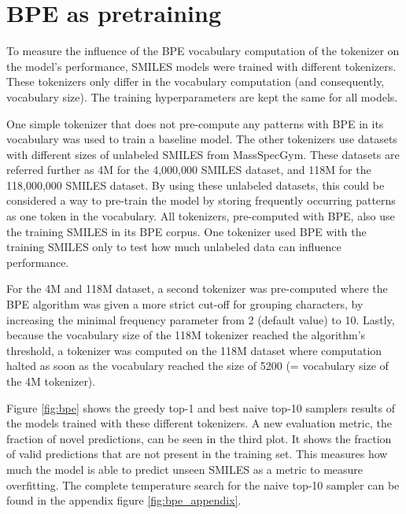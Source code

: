 \section{\ac{BPE} as pretraining}

To measure the influence of the \acf{BPE} vocabulary computation of the tokenizer on the model's performance, SMILES models were trained with different tokenizers.
These tokenizers only differ in the vocabulary computation (and consequently, vocabulary size).
The training hyperparameters are kept the same for all models.

One simple tokenizer that does not pre-compute any patterns with \ac{BPE} in its vocabulary was used to train a baseline model.
The other tokenizers use datasets with different sizes of unlabeled SMILES from MassSpecGym.
These datasets are referred further as 4M for the 4,000,000 SMILES dataset, and 118M for the 118,000,000 SMILES dataset.
By using these unlabeled datasets, this could be considered a way to pre-train the model by storing frequently occurring patterns as one token in the vocabulary. 
All tokenizers, pre-computed with \ac{BPE}, also use the training SMILES in its \ac{BPE} corpus.
One tokenizer used \ac{BPE} with the training SMILES only to test how much unlabeled data can influence performance.

For the 4M and 118M dataset, a second tokenizer was pre-computed where the \ac{BPE} algorithm was given a more strict cut-off for grouping characters, by increasing the minimal frequency parameter from 2 (default value) to 10.
Lastly, because the vocabulary size of the 118M tokenizer reached the algorithm's threshold, a tokenizer was computed on the 118M dataset where computation halted as soon as the vocabulary reached the size of 5200 (= vocabulary size of the 4M tokenizer). 

Figure \ref{fig:bpe} shows the greedy top-1 and best naive top-10 samplers results of the models trained with these different tokenizers.
A new evaluation metric, the fraction of novel predictions, can be seen in the third plot.
It shows the fraction of valid predictions that are not present in the training set.
This measures how much the model is able to predict unseen SMILES as a metric to measure overfitting.
The complete temperature search for the naive top-10 sampler can be found in the appendix figure \ref{fig:bpe_appendix}.


